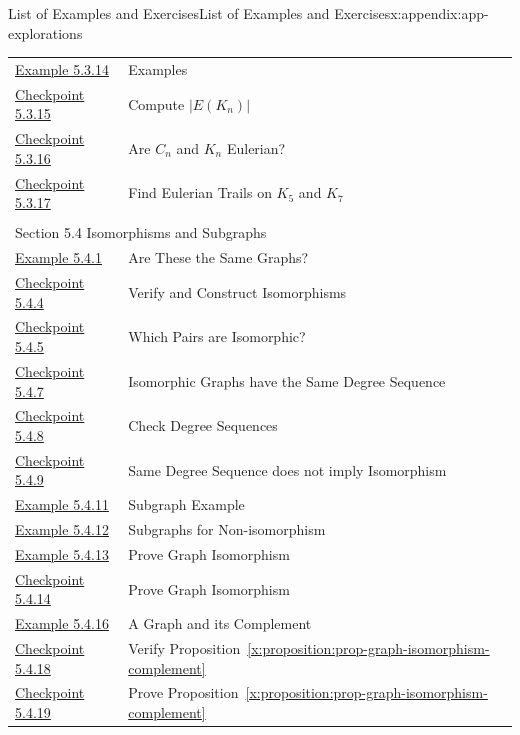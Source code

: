 \documentclass[oneside,10pt,]{book}
\newcommand{\xreffont}{\relax}
\numberwithin{equation}{section}
\begin{document}
\begin{appendixptx}{List of Examples and Exercises}{}{List of Examples and Exercises}{}{}{x:appendix:app-explorations}
\begin{longtable}[l]{ll}
\hyperref[x:example:eg-cycle-complete]{Example 5.3.14}& Examples\\
\hyperref[x:exercise:ex-graph-complete-edges]{Checkpoint 5.3.15}& Compute \(|E(K_n)|\)\\
\hyperref[x:exercise:ex-graph-cycle-complete-degrees]{Checkpoint 5.3.16}& Are \(C_n\) and \(K_n\) Eulerian?\\
\hyperref[x:exercise:ex-graph-complete-find-eulerian]{Checkpoint 5.3.17}& Find Eulerian Trails on \(K_5\) and \(K_7\)\\
\multicolumn{2}{l}{\null}\\[1.5ex] \multicolumn{2}{l}{\large Section 5.4 Isomorphisms and Subgraphs}\\[0.5ex]
\hyperref[x:example:eg-graph-equal-isomorphic]{Example 5.4.1}& Are These the Same Graphs?\\
\hyperref[x:exercise:ex-graph-isomorphism]{Checkpoint 5.4.4}& Verify and Construct Isomorphisms\\
\hyperref[x:exercise:ex-graph-determine-isomorphism]{Checkpoint 5.4.5}& Which Pairs are Isomorphic?\\
\hyperref[x:exercise:ex-graph-isomorphism-degree]{Checkpoint 5.4.7}& Isomorphic Graphs have the Same Degree Sequence\\
\hyperref[x:exercise:ex-graph-isomorphism-degree-check]{Checkpoint 5.4.8}& Check Degree Sequences\\
\hyperref[x:exercise:ex-graph-isomorphism-degree-converse]{Checkpoint 5.4.9}& Same Degree Sequence does not imply Isomorphism\\
\hyperref[x:example:eg-subgraph]{Example 5.4.11}& Subgraph Example\\
\hyperref[x:example:eg-subgraph-not-isomorphic]{Example 5.4.12}& Subgraphs for Non-isomorphism\\
\hyperref[x:example:eg-graph-construct-isomorphism]{Example 5.4.13}& Prove Graph Isomorphism\\
\hyperref[x:exercise:ex-graph-prove-isomorphic]{Checkpoint 5.4.14}& Prove Graph Isomorphism\\
\hyperref[x:example:eg-graph-complement]{Example 5.4.16}& A Graph and its Complement\\
\hyperref[x:exercise:ex-graph-isomorphism-complement]{Checkpoint 5.4.18}& Verify Proposition~{\xreffont\ref*{x:proposition:prop-graph-isomorphism-complement}}\\
\hyperref[x:exercise:ex-graph-prove-complement]{Checkpoint 5.4.19}& Prove Proposition~{\xreffont\ref*{x:proposition:prop-graph-isomorphism-complement}}\\

\end{longtable}
\end{appendixptx}
\end{document}
